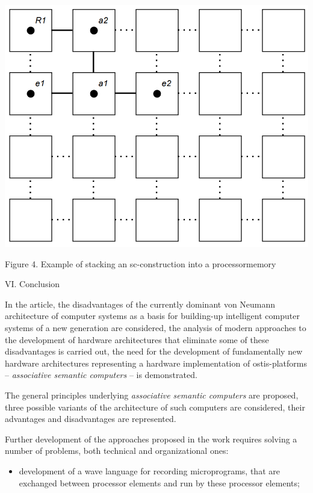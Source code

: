 \documentclass{article}
\begin{document}
{\begin{multicols}{2}
\begin{center}
    \includegraphics[scale=0.32]{images/abobus.png}
\end{center}
\vspace{+5pt}
{\small Figure 4. Example of stacking an sc-construction into a processormemory}


\begin{center}
    \vspace{+6pt}
    {\large VI. Conclusion}
\end{center}

\vspace{-2pt}
In the article, the disadvantages of the currently
dominant von Neumann architecture of computer systems
as a basis for building-up intelligent computer systems of
a new generation are considered, the analysis of modern
approaches to the development of hardware architectures
that eliminate some of these disadvantages is carried
out, the need for the development of fundamentally
new hardware architectures representing a hardware
implementation of ostis-platforms – \textit{associative semantic
computers} – is demonstrated.

The general principles underlying \textit{associative semantic
computers} are proposed, three possible variants of the
architecture of such computers are considered, their
advantages and disadvantages are represented.

Further development of the approaches proposed in
the work requires solving a number of problems, both
technical and organizational ones:
\vspace{+3pt}
\begin{itemize}
    \item development of a wave language for recording microprograms, that are exchanged between processor
    elements and run by these processor elements;
    

\end{itemize}
\end{multicols}}
\end{document}
